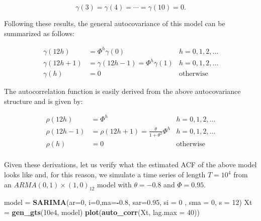 \documentclass[]{book}
\newenvironment{Shaded}{\begin{snugshade}}{\end{snugshade}}
\newcommand{\KeywordTok}[1]{\textcolor[rgb]{0.13,0.29,0.53}{\textbf{#1}}}
\newcommand{\DataTypeTok}[1]{\textcolor[rgb]{0.13,0.29,0.53}{#1}}
\newcommand{\DecValTok}[1]{\textcolor[rgb]{0.00,0.00,0.81}{#1}}
\newcommand{\FloatTok}[1]{\textcolor[rgb]{0.00,0.00,0.81}{#1}}
\newcommand{\StringTok}[1]{\textcolor[rgb]{0.31,0.60,0.02}{#1}}
\newcommand{\OperatorTok}[1]{\textcolor[rgb]{0.81,0.36,0.00}{\textbf{#1}}}
\newcommand{\NormalTok}[1]{#1}
\theoremstyle{definition}
\theoremstyle{definition}
\theoremstyle{definition}
\theoremstyle{remark}
\begin{document}
\begin{equation}
\gamma \left( 3 \right) = \gamma \left( 4 \right) = \cdots = \gamma \left( 10 \right) = 0.
\end{equation}

Following these results, the general autocovariance of this model can be
summarized as follows:

\begin{align*}
\gamma \left( {12h} \right) &= {\Phi ^h}\gamma \left( 0 \right) &h = 0, 1, 2, \ldots \\[0.2cm]
\gamma \left( {12h + 1} \right) &= \gamma \left( {12h - 1} \right) = {\Phi ^h}\gamma \left( 1 \right) &h = 0, 1, 2, \ldots \\[0.2cm]
\gamma \left( {h} \right) &= 0  &\text{otherwise}
\end{align*}

The autocorrelation function is easily derived from the above
autocovariance structure and is given by:

\begin{align*}
  \rho \left( {12h} \right) &= {\Phi ^h} & h = 0, 1, 2, \ldots  \\
  \rho \left( {12h - 1} \right) &= \rho \left( {12h + 1} \right) = \frac{\theta }{{1 + {\theta ^2}}}{\Phi ^h} & h = 0, 1, 2, \ldots \\
  \rho \left( h \right) &= 0 & \text{otherwise}  \\
\end{align*}

Given these derivations, let us verify what the estimated ACF of the
above model looks like and, for this reason, we simulate a time series
of length \(T = 10^4\) from an \(ARMA(0,1)\times(1, 0)_{12}\) model with
\(\theta = -0.8\) and \(\Phi = 0.95\).

\begin{Shaded}
\begin{Highlighting}[]
\NormalTok{model =}\StringTok{ }\KeywordTok{SARIMA}\NormalTok{(}\DataTypeTok{ar=}\DecValTok{0}\NormalTok{, }\DataTypeTok{i=}\DecValTok{0}\NormalTok{,}\DataTypeTok{ma=}\OperatorTok{-}\FloatTok{0.8}\NormalTok{, }\DataTypeTok{sar=}\FloatTok{0.95}\NormalTok{, }\DataTypeTok{si =} \DecValTok{0}\NormalTok{ , }\DataTypeTok{sma =} \DecValTok{0}\NormalTok{, }\DataTypeTok{s =} \DecValTok{12}\NormalTok{)}
\NormalTok{Xt =}\StringTok{ }\KeywordTok{gen_gts}\NormalTok{(}\FloatTok{10e4}\NormalTok{, model)}
\KeywordTok{plot}\NormalTok{(}\KeywordTok{auto_corr}\NormalTok{(Xt, }\DataTypeTok{lag.max =} \DecValTok{40}\NormalTok{))}
\end{Highlighting}
\end{Shaded}
\end{document}
